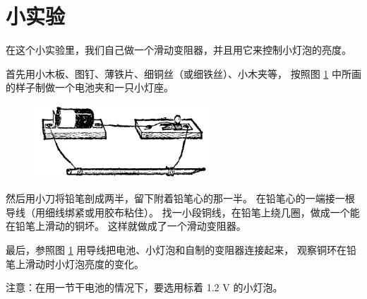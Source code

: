 \section*{小实验}

在这个小实验里，我们自己做一个滑动变阻器，并且用它来控制小灯泡的亮度。

首先用小木板、图钉、薄铁片、细铜丝（或细铁丝）、小木夹等，
按照图 \ref{fig:8-26} 中所画的样子制做一个电池夹和一只小灯座。

\begin{figure}[htbp]
    \centering
    \includegraphics[width=0.6\textwidth]{../pic/czwl2-ch8-26}
    \caption{}\label{fig:8-26}
\end{figure}

然后用小刀将铅笔剖成两半，留下附着铅笔心的那一半。
在铅笔心的一端接一根导线（用细线绑紧或用胶布粘住）。
找一小段铜线，在铅笔上绕几圈，做成一个能在铅笔上滑动的铜坏。
这样就做成了一个滑动变阻器。

最后，参照图 \ref{fig:8-26} 用导线把电池、小灯泡和自制的变阻器连接起来，
观察铜环在铅笔上滑动时小灯泡亮度的变化。

注意：在用一节干电池的情况下，要选用标着 1.2 V 的小灯泡。

